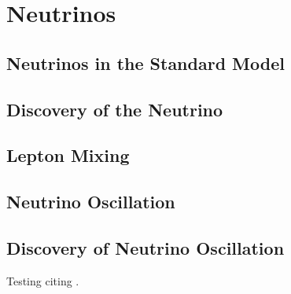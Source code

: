\chapter{Neutrinos}



\section{Neutrinos in the Standard Model} 

\section{Discovery of the Neutrino}

\section{Lepton Mixing}

\section{Neutrino Oscillation}

\section{Discovery of Neutrino Oscillation}






Testing citing \cite{Huber}.

